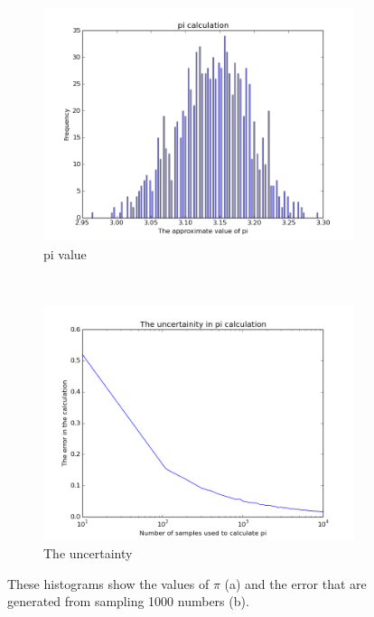 \begin{figure}
    \centering
    \begin{subfigure}[b]{0.5\textwidth}
        \includegraphics[scale=.5]{images/pi_value.png} 
        \caption{pi value}
        \label{fig:gull}
    \end{subfigure}
    ~ %
    \begin{subfigure}[b]{0.5\textwidth}
        \includegraphics[scale=0.5]{images/uncertainity_pi.png}
        \caption{The uncertainty}
        \label{fig:tiger}
    \end{subfigure}
    \label{Fig:1}
\caption{These histograms show the values of $\pi$ (a) and the error that are generated from sampling 1000 numbers (b).} 
\label{fig:1.1}
\end{figure}           